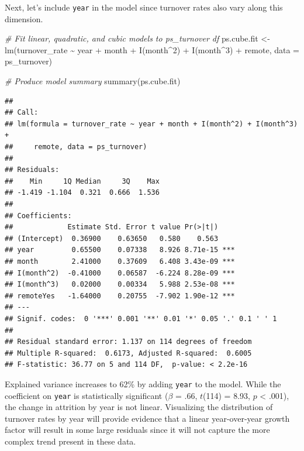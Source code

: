 \documentclass[
]{book}
\newenvironment{Shaded}{\begin{snugshade}}{\end{snugshade}}
\newcommand{\AttributeTok}[1]{\textcolor[rgb]{0.77,0.63,0.00}{#1}}
\newcommand{\CommentTok}[1]{\textcolor[rgb]{0.56,0.35,0.01}{\textit{#1}}}
\newcommand{\DecValTok}[1]{\textcolor[rgb]{0.00,0.00,0.81}{#1}}
\newcommand{\FunctionTok}[1]{\textcolor[rgb]{0.00,0.00,0.00}{#1}}
\newcommand{\NormalTok}[1]{#1}
\newcommand{\OtherTok}[1]{\textcolor[rgb]{0.56,0.35,0.01}{#1}}
\newcommand{\SpecialCharTok}[1]{\textcolor[rgb]{0.00,0.00,0.00}{#1}}
\begin{document}
Next, let's include \texttt{year} in the model since turnover rates also vary along this dimension.

\begin{Shaded}
\begin{Highlighting}[]
\CommentTok{\# Fit linear, quadratic, and cubic models to ps\_turnover df}
\NormalTok{ps.cube.fit }\OtherTok{\textless{}{-}} \FunctionTok{lm}\NormalTok{(turnover\_rate }\SpecialCharTok{\textasciitilde{}}\NormalTok{ year }\SpecialCharTok{+}\NormalTok{ month }\SpecialCharTok{+} \FunctionTok{I}\NormalTok{(month}\SpecialCharTok{\^{}}\DecValTok{2}\NormalTok{) }\SpecialCharTok{+} \FunctionTok{I}\NormalTok{(month}\SpecialCharTok{\^{}}\DecValTok{3}\NormalTok{) }\SpecialCharTok{+}\NormalTok{ remote, }\AttributeTok{data =}\NormalTok{ ps\_turnover)}

\CommentTok{\# Produce model summary}
\FunctionTok{summary}\NormalTok{(ps.cube.fit)}
\end{Highlighting}
\end{Shaded}

\begin{verbatim}
## 
## Call:
## lm(formula = turnover_rate ~ year + month + I(month^2) + I(month^3) + 
##     remote, data = ps_turnover)
## 
## Residuals:
##    Min     1Q Median     3Q    Max 
## -1.419 -1.104  0.321  0.666  1.536 
## 
## Coefficients:
##             Estimate Std. Error t value Pr(>|t|)    
## (Intercept)  0.36900    0.63650   0.580    0.563    
## year         0.65500    0.07338   8.926 8.71e-15 ***
## month        2.41000    0.37609   6.408 3.43e-09 ***
## I(month^2)  -0.41000    0.06587  -6.224 8.28e-09 ***
## I(month^3)   0.02000    0.00334   5.988 2.53e-08 ***
## remoteYes   -1.64000    0.20755  -7.902 1.90e-12 ***
## ---
## Signif. codes:  0 '***' 0.001 '**' 0.01 '*' 0.05 '.' 0.1 ' ' 1
## 
## Residual standard error: 1.137 on 114 degrees of freedom
## Multiple R-squared:  0.6173, Adjusted R-squared:  0.6005 
## F-statistic: 36.77 on 5 and 114 DF,  p-value: < 2.2e-16
\end{verbatim}

Explained variance increases to 62\% by adding \texttt{year} to the model. While the coefficient on \texttt{year} is statistically significant (\(\beta\) = .66, \(t\)(114) = 8.93, \(p\) \textless{} .001), the change in attrition by year is not linear. Visualizing the distribution of turnover rates by year will provide evidence that a linear year-over-year growth factor will result in some large residuals since it will not capture the more complex trend present in these data.
\end{document}
